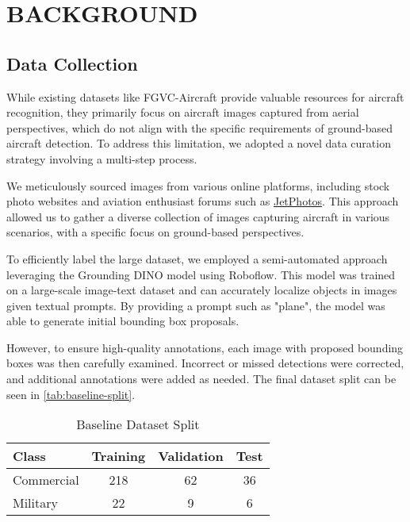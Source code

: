 \section{\uppercase{Background}}
\label{sec:background}

\subsection{Data Collection}
\label{sub:data-collection}
While existing datasets like FGVC-Aircraft provide valuable resources for aircraft recognition, they primarily focus on aircraft images captured from aerial perspectives, which do not align with the specific requirements of ground-based aircraft detection. To address this limitation, we adopted a novel data curation strategy involving a multi-step process.

We meticulously sourced images from various online platforms, including stock photo websites and aviation enthusiast forums such as \href{jetphotos.com}{JetPhotos}. This approach allowed us to gather a diverse collection of images capturing aircraft in various scenarios, with a specific focus on ground-based perspectives.

To efficiently label the large dataset, we employed a semi-automated approach leveraging the Grounding DINO model using Roboflow. This model was trained on a large-scale image-text dataset and can accurately localize objects in images given textual prompts. By providing a prompt such as "plane", the model was able to generate initial bounding box proposals.

However, to ensure high-quality annotations, each image with proposed bounding boxes was then carefully examined. Incorrect or missed detections were corrected, and additional annotations were added as needed. The final dataset split can be seen in \autoref{tab:baseline-split}.

\begin{table}
\small
\centering
\caption{Baseline Dataset Split}

\setlength\tabcolsep{4pt}
\begin{tabular}{lccc}
\toprule
Class & Training&Validation&Test\\ \midrule
Commercial &218 & 62 & 36    \\
Military& 22 & 9 & 6 \\ 

\bottomrule
\end{tabular}
\vspace{0pt}

\label{tab:baseline-split}
\end{table}

